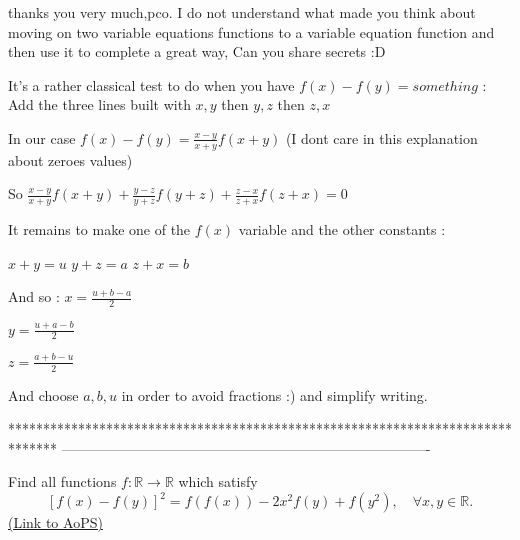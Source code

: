 \begin{solution}
	\begin{tcolorbox} thanks you very much,pco.
I do not understand what made you think about moving on two variable equations functions  to a variable equation function and then use it to complete a great way, Can you share secrets  :D\end{tcolorbox}
It's a rather classical test to do when you have $f(x)-f(y)=something$ :
Add the three lines built with $x,y$ then $y,z$ then $z,x$

In our case $f(x)-f(y)=\frac{x-y}{x+y}f(x+y)$ (I dont care in this explanation about zeroes values)

So $\frac{x-y}{x+y}f(x+y)+\frac{y-z}{y+z}f(y+z)+\frac{z-x}{z+x}f(z+x)=0$

It remains to make one of the $f(x)$ variable and the other constants :

$x+y=u$
$y+z=a$
$z+x=b$

And so :
$x=\frac {u+b-a}2$

$y=\frac{u+a-b}2$

$z=\frac {a+b-u}2$

And choose $a,b,u$ in order to avoid fractions :) and simplify writing.
\end{solution}
*******************************************************************************
-------------------------------------------------------------------------------

\begin{problem}
	Find all functions $f: \mathbb R \to \mathbb R$ which satisfy
\[[f(x)-f(y)]^2=f(f(x))-2x^2f(y)+f(y^2), \quad \forall x,y \in \mathbb R.\]
	\flushright \href{https://artofproblemsolving.com/community/c6h395730}{(Link to AoPS)}
\end{problem}



